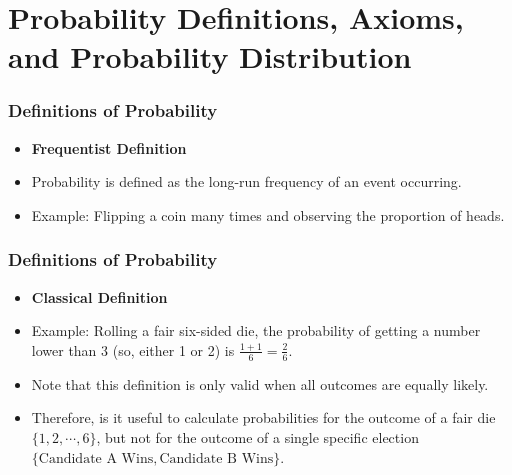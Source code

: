 \documentclass[handout]{beamer} %
\begin{document}
\section{Probability Definitions, Axioms, and Probability Distribution}

\begin{frame}
\frametitle{Definitions of Probability}
\begin{itemize}
    \item \textbf{Frequentist Definition}
\end{itemize}

\pause

    \begin{itemize}
        \item Probability is defined as the long-run frequency of an event occurring.  \pause
        \item Example: Flipping a coin many times and observing the proportion of heads.
    \end{itemize}
\end{frame}

\begin{frame}
\frametitle{Definitions of Probability}
\begin{itemize}
    \item \textbf{Classical Definition}
\end{itemize}

\pause

    \begin{itemize}
        \item Example: Rolling a fair six-sided die, the probability of getting a number lower than 3 (so, either 1 or 2) is \( \frac{1+1}{6} =\frac{2}{6} \). \pause
        \item Note that this definition is only valid when all outcomes are equally likely. \pause
        \item Therefore, is it useful to calculate probabilities for the outcome of a fair die $\{1,2, \cdots, 6\}$, but not for the outcome of a single specific election $\{\text{Candidate A Wins}, \text{Candidate B Wins}\}$.
    \end{itemize}
\end{frame}
\end{document}
